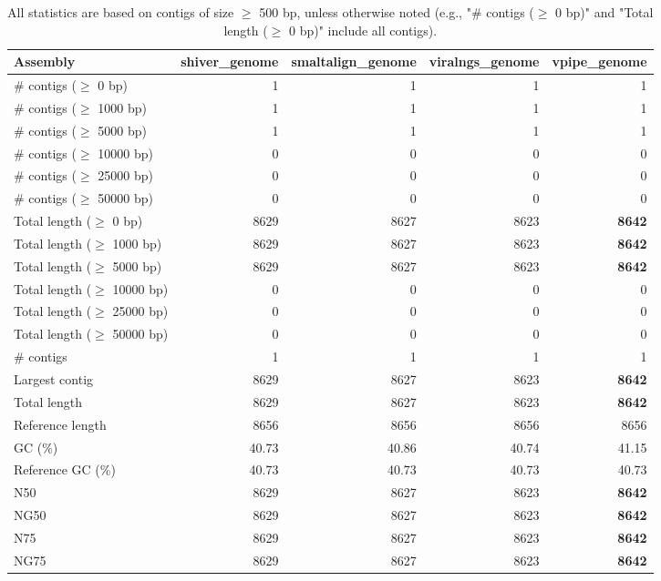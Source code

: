 \documentclass[12pt,a4paper]{article}
\begin{document}
\begin{table}[ht]
\begin{center}
\caption{All statistics are based on contigs of size $\geq$ 500 bp, unless otherwise noted (e.g., "\# contigs ($\geq$ 0 bp)" and "Total length ($\geq$ 0 bp)" include all contigs).}
\begin{tabular}{|l*{4}{|r}|}
\hline
Assembly & shiver\_genome & smaltalign\_genome & viralngs\_genome & vpipe\_genome \\ \hline
\# contigs ($\geq$ 0 bp) & 1 & 1 & 1 & 1 \\ \hline
\# contigs ($\geq$ 1000 bp) & 1 & 1 & 1 & 1 \\ \hline
\# contigs ($\geq$ 5000 bp) & 1 & 1 & 1 & 1 \\ \hline
\# contigs ($\geq$ 10000 bp) & 0 & 0 & 0 & 0 \\ \hline
\# contigs ($\geq$ 25000 bp) & 0 & 0 & 0 & 0 \\ \hline
\# contigs ($\geq$ 50000 bp) & 0 & 0 & 0 & 0 \\ \hline
Total length ($\geq$ 0 bp) & 8629 & 8627 & 8623 & {\bf 8642} \\ \hline
Total length ($\geq$ 1000 bp) & 8629 & 8627 & 8623 & {\bf 8642} \\ \hline
Total length ($\geq$ 5000 bp) & 8629 & 8627 & 8623 & {\bf 8642} \\ \hline
Total length ($\geq$ 10000 bp) & 0 & 0 & 0 & 0 \\ \hline
Total length ($\geq$ 25000 bp) & 0 & 0 & 0 & 0 \\ \hline
Total length ($\geq$ 50000 bp) & 0 & 0 & 0 & 0 \\ \hline
\# contigs & 1 & 1 & 1 & 1 \\ \hline
Largest contig & 8629 & 8627 & 8623 & {\bf 8642} \\ \hline
Total length & 8629 & 8627 & 8623 & {\bf 8642} \\ \hline
Reference length & 8656 & 8656 & 8656 & 8656 \\ \hline
GC (\%) & 40.73 & 40.86 & 40.74 & 41.15 \\ \hline
Reference GC (\%) & 40.73 & 40.73 & 40.73 & 40.73 \\ \hline
N50 & 8629 & 8627 & 8623 & {\bf 8642} \\ \hline
NG50 & 8629 & 8627 & 8623 & {\bf 8642} \\ \hline
N75 & 8629 & 8627 & 8623 & {\bf 8642} \\ \hline
NG75 & 8629 & 8627 & 8623 & {\bf 8642} \\ \hline

\end{tabular}
\end{center}
\end{table}
\end{document}
